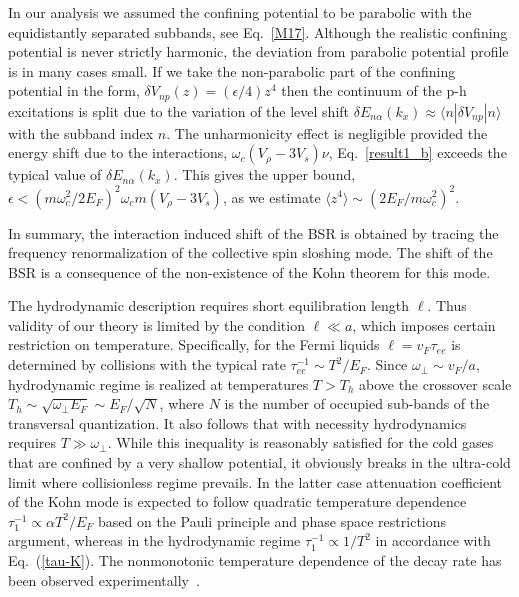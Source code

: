 In our analysis we assumed the confining potential to be parabolic with the equidistantly separated subbands, see Eq.~\eqref{M17}.
Although the realistic confining potential is never strictly harmonic, the deviation from parabolic potential profile is in many cases small. 
If we take the non-parabolic part of the confining potential in the form,
$\delta V_{np}(z) = (\epsilon/4)z^4$ then the continuum of the p-h excitations is split due to the variation of the level shift $\delta E_{n\alpha}(k_x) \approx \langle n | \delta V_{np}| n \rangle $ with the subband index $n$.
The unharmonicity effect is negligible provided the energy shift due to the interactions, $\omega_c (V_{\rho} \! -\!  3 V_s)\nu$, Eq.~\eqref{result1_b} exceeds the typical value of $\delta E_{n\alpha}(k_x)$. 
This gives the upper bound, $\epsilon < (m \omega_c^2/ 2 E_F)^2 \omega_c m (V_{\rho} \! -\!  3 V_s)$, as we estimate $\langle z^4 \rangle \sim  (2 E_F/ m \omega_c^2)^2$.

In summary, the interaction induced shift of the BSR is obtained by tracing the frequency renormalization of the collective spin sloshing mode.
The shift of the BSR is a consequence of the non-existence of the Kohn theorem for this mode.

The hydrodynamic description requires short equilibration length $\ell$. Thus validity of our theory is limited by the condition $\ell\ll a$, which imposes certain restriction on temperature. Specifically, for the Fermi liquids $\ell=v_F\tau_{ee}$ is determined by collisions with the typical rate $\tau^{-1}_{ee}\sim T^2/E_F$. Since $\omega_\perp\sim v_F/a$, hydrodynamic regime is realized at temperatures $T>T_h$ above the crossover scale $T_h\sim\sqrt{\omega_\perp E_F}\sim E_F/\sqrt{N}$, where $N$ is the number of occupied sub-bands of the transversal quantization. It also follows that with necessity hydrodynamics requires $T\gg\omega_\perp$. While this inequality is reasonably satisfied for the cold gases that are confined by a very shallow potential, it obviously breaks in the ultra-cold limit where collisionless regime prevails. In the latter case attenuation coefficient of the Kohn mode is expected to follow quadratic temperature dependence $\tau^{-1}_{1}\propto \alpha T^2/E_F$ based on the Pauli principle and phase space restrictions argument, whereas in the hydrodynamic regime $\tau^{-1}_{1}\propto 1/T^2$ in accordance with Eq.~(\ref{tau-K}). The nonmonotonic temperature dependence of the decay rate has been observed experimentally~\cite{Riedl}.  

